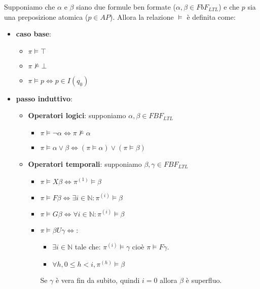 \begin{definizione} [$\vDash$]
    Supponiamo che $\alpha$ e $\beta$ siano due formule ben formate ($\alpha,
        \beta \in FbF_{LTL}$) e che  $p$ sia una preposizione atomica ($p \in AP$).
    Allora la relazione $\vDash$ è definita come:
    \begin{itemize}
        \item \textbf{caso base}:
              \begin{itemize}
                  \item $\pi \vDash \top$
                  \item $\pi \not\vDash \bot$
                  \item $\pi \vDash p \iff p\in I(q_0)$
              \end{itemize}
        \item \textbf{passo induttivo}:
              \begin{itemize}
                  \item  \textbf{Operatori logici}: supponiamo $\alpha, \beta \in FBF_{LTL}$
                        \begin{itemize}
                            \item $\pi \vDash \lnot \alpha \iff \pi \not\vDash \alpha$
                            \item $\pi \vDash \alpha \lor \beta \iff (\pi \vDash \alpha) \lor (\pi
                                      \vDash \beta) $
                        \end{itemize}
                  \item \textbf{Operatori temporali}: supponiamo $\beta, \gamma \in FBF_{LTL}$
                        \begin{itemize}
                            \item $\pi \vDash X\beta \iff \pi^{(1)}\vDash \beta$
                            \item $\pi \vDash F \beta \iff \exists i \in \mathbb{N}:
                                      \pi^{(i)} \vDash \beta$
                            \item $\pi \vDash G \beta \iff \forall i \in \mathbb{N}:
                                      \pi^{(i)} \vDash \beta$
                            \item $\pi \vDash \beta U \gamma \iff$:
                                  \begin{itemize}
                                      \item $\exists i \in \mathbb{N}$ tale che: $\pi^{(i)}
                                                \vDash \gamma$ cioè $\pi \vDash F \gamma$.
                                      \item $\forall h, 0 \leq h < i, \pi^{(h)} \vDash \beta$
                                  \end{itemize}
                                  Se $\gamma$ è vera fin da subito, quindi $i = 0$ allora
                                  $\beta$ è superfluo.
                        \end{itemize}
              \end{itemize}
    \end{itemize}
\end{definizione}
